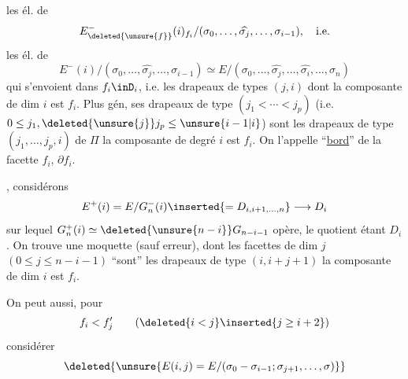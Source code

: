 les él. de
\[
E^-_{\deleted{\unsure{f}}}(i)_{f_i}/(\sigma_0,\ldots,\widehat{\sigma_j},\ldots,\sigma_{i-1}),\quad\text{i.e.}
\]
les él. de
\[
E^-(i)/(\sigma_0,\ldots,\widehat{\sigma_j},\ldots,\sigma_{i-1})
\simeq E/(\sigma_0,\ldots,\widehat{\sigma_j},\ldots,\widehat{\sigma_i},\ldots,\sigma_n)
\]
qui  s'envoient dans $f_i\inD_i$, i.e. les drapeaux de types $(j,i)$ dont la composante de  dim $i$ est $f_i$. Plus gén, ses drapeaux de type $(j_1<\cdots<j_p)$ (i.e. $0\leq j_1,\deleted{\unsure{j}}j_p\leq\unsure{i-1|i}$) sont les drapeaux de type $(j_1,\ldots,j_p,i)$ de $\Pi$  la composante de degré $i$ est $f_i$. On l'appelle   ``\uline{bord}'' de la facette $f_i$,  $\partial f_i$.

, considérons
\[
E^+(i)=E/G_n^-(i)\inserted{=D_{i,i+1,\ldots,n}}\longrightarrow D_i
\]
sur lequel $G_n^+(i)\simeq\deleted{\unsure{n-i}}G_{n-i-1}$ opère, le quotient étant $D_i$. On trouve une moquette  (sauf erreur), dont les facettes de dim $j$ $(0\leq j\leq n-i-1)$ ``sont'' les drapeaux de type $(i,i+j+1)$   la composante de dim $i$ est $f_i$.

On peut aussi, pour  
\[
f_i<f'_j\qquad(\deleted{i<j}\inserted{j\geq i+2})
\]
considérer
\[
\deleted{\unsure{E(i,j)=E/(\sigma_0-\sigma_{i-1};\sigma_{j+1},\ldots,\sigma)}}
\]
